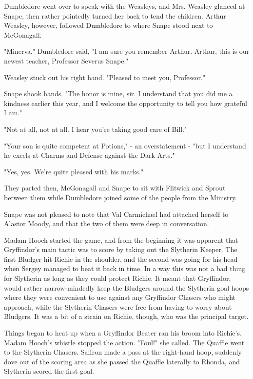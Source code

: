 Dumbledore went over to speak with the Weasleys, and Mrs. Weasley glanced at Snape, then rather pointedly turned her back to tend the children. Arthur Weasley, however, followed Dumbledore to where Snape stood next to McGonagall.

"Minerva," Dumbledore said, "I am sure you remember Arthur. Arthur, this is our newest teacher, Professor Severus Snape."

Weasley stuck out his right hand. "Pleased to meet you, Professor."

Snape shook hands. "The honor is mine, sir. I understand that you did me a kindness earlier this year, and I welcome the opportunity to tell you how grateful I am."

"Not at all, not at all. I hear you're taking good care of Bill."

"Your son is quite competent at Potions," - an overstatement - "but I understand he excels at Charms and Defense against the Dark Arts."

"Yes, yes. We're quite pleased with his marks."

They parted then, McGonagall and Snape to sit with Flitwick and Sprout between them while Dumbledore joined some of the people from the Ministry.

Snape was not pleased to note that Val Carmichael had attached herself to Alastor Moody, and that the two of them were deep in conversation.

Madam Hooch started the game, and from the beginning it was apparent that Gryffindor's main tactic was to score by taking out the Slytherin Keeper. The first Bludger hit Richie in the shoulder, and the second was going for his head when Sergey managed to beat it back in time. In a way this was not a bad thing for Slytherin as long as they could protect Richie. It meant that Gryffindor, would rather narrow-mindedly keep the Bludgers around the Slytherin goal hoops where they were convenient to use against any Gryffindor Chasers who might approach, while the Slytherin Chasers were free from having to worry about Bludgers. It was a bit of a strain on Richie, though, who was the principal target.

Things began to heat up when a Gryffindor Beater ran his broom into Richie's. Madam Hooch's whistle stopped the action. "Foul!" she called. The Quaffle went to the Slytherin Chasers. Saffron made a pass at the right-hand hoop, suddenly dove out of the scoring area as she passed the Quaffle laterally to Rhonda, and Slytherin scored the first goal.

